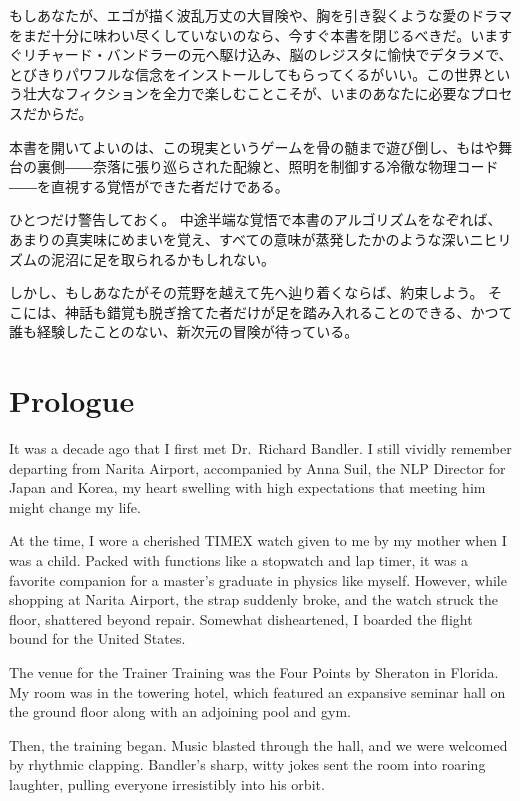     もしあなたが、エゴが描く波乱万丈の大冒険や、胸を引き裂くような愛のドラマをまだ十分に味わい尽くしていないのなら、今すぐ本書を閉じるべきだ。いますぐリチャード・バンドラーの元へ駆け込み、脳のレジスタに愉快でデタラメで、とびきりパワフルな信念をインストールしてもらってくるがいい。この世界という壮大なフィクションを全力で楽しむことこそが、いまのあなたに必要なプロセスだからだ。

    本書を開いてよいのは、この現実というゲームを骨の髄まで遊び倒し、もはや舞台の裏側――奈落に張り巡らされた配線と、照明を制御する冷徹な物理コード――を直視する覚悟ができた者だけである。

    ひとつだけ警告しておく。
    中途半端な覚悟で本書のアルゴリズムをなぞれば、あまりの真実味にめまいを覚え、すべての意味が蒸発したかのような深いニヒリズムの泥沼に足を取られるかもしれない。

    しかし、もしあなたがその荒野を越えて先へ辿り着くならば、約束しよう。
    そこには、神話も錯覚も脱ぎ捨てた者だけが足を踏み入れることのできる、かつて誰も経験したことのない、新次元の冒険が待っている。
\else
    \chapter*{Prologue}
    
    It was a decade ago that I first met Dr.~Richard Bandler.
    I still vividly remember departing from Narita Airport, accompanied by Anna Suil, the NLP Director for Japan and Korea, my heart swelling with high expectations that meeting him might change my life.

    At the time, I wore a cherished TIMEX watch given to me by my mother when I was a child. Packed with functions like a stopwatch and lap timer, it was a favorite companion for a master's graduate in physics like myself.
    However, while shopping at Narita Airport, the strap suddenly broke, and the watch struck the floor, shattered beyond repair. Somewhat disheartened, I boarded the flight bound for the United States.

    The venue for the Trainer Training was the Four Points by Sheraton in Florida. My room was in the towering hotel, which featured an expansive seminar hall on the ground floor along with an adjoining pool and gym.

    Then, the training began.
    Music blasted through the hall, and we were welcomed by rhythmic clapping. Bandler's sharp, witty jokes sent the room into roaring laughter, pulling everyone irresistibly into his orbit.

